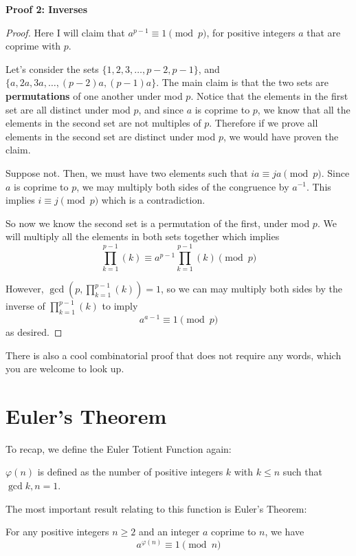 \documentclass{article}
\theoremstyle{mytheoremstyle}
\theoremstyle{mytheoremstyle}
\theoremstyle{myproblemstyle}
\begin{document}
    \textbf{Proof 2: Inverses}
    \begin{proof}
        Here I will claim that $a^{p-1} \equiv 1 \pmod{p}$, for  positive integers $a$ that are coprime with $p$.

        Let's consider the sets $\{1, 2, 3, \hdots, p-2, p-1\}$, and $\{a, 2a, 3a, \hdots, (p-2)a, (p-1)a\}$. The main claim is that the two sets are \textbf{permutations} of one another under mod $p$. Notice that the elements in the first set are all distinct under mod $p$, and since $a$ is coprime to $p$, we know that all the elements in the second set are not multiples of $p$. Therefore if we prove all elements in the second set are distinct under mod $p$, we would have proven the claim.

        Suppose not. Then, we must have two elements such that $ia \equiv ja \pmod{p}$. Since $a$ is coprime to $p$, we may multiply both sides of the congruence by $a^{-1}$. This implies $i \equiv j \pmod{p}$ which is a contradiction. 

        So now we know the second set is a permutation of the first, under mod $p$. We will multiply all the elements in both sets together which implies
        \[\prod_{k = 1}^{p-1}(k) \equiv a^{p-1}\prod_{k = 1}^{p-1}(k) \pmod{p}\]

        However, $\gcd\left(p, \prod_{k = 1}^{p-1}(k)\right) = 1$, so we can may multiply both sides by the inverse of $\prod_{k = 1}^{p-1}(k)$ to imply \[a^{a-1} \equiv 1 \pmod{p}\] as desired. 
    \end{proof}

    There is also a cool combinatorial proof that does not require any words, which you are welcome to look up.

    \section{Euler's Theorem}
    To recap, we define the Euler Totient Function again:
    \begin{definition}
        $\varphi(n)$ is defined as the number of positive integers $k$ with $k \leq n$ such that $\gcd{k, n} = 1$.
    \end{definition}

    The most important result relating to this function is Euler's Theorem:
    \begin{theorem}
        For any positive integers $n \geq 2$ and an integer $a$ coprime to $n$, we have \[a^{\varphi(n)} \equiv 1 \pmod{n}\]        
    \end{theorem}
\end{document}
